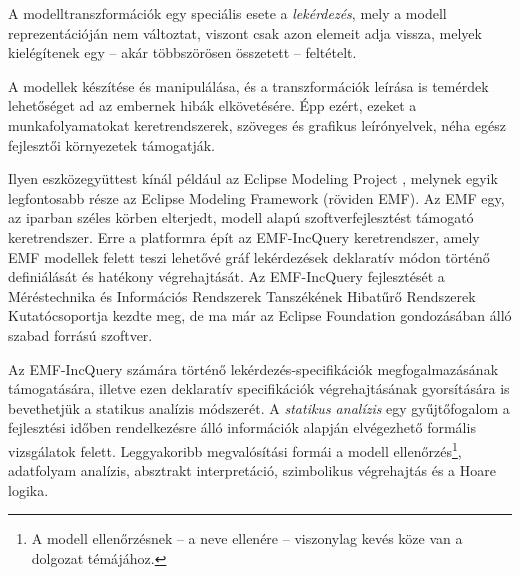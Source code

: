 A modelltranszformációk egy speciális esete a \emph{lekérdezés}, mely a modell reprezentációján nem változtat, viszont csak azon elemeit adja vissza, melyek kielégítenek egy -- akár többszörösen összetett -- feltételt.

A modellek készítése és manipulálása, és a transzformációk leírása is temérdek lehetőséget ad az embernek hibák elkövetésére.
Épp ezért, ezeket a munkafolyamatokat keretrendszerek, szöveges és grafikus \cite{Gyorok13} leírónyelvek, néha egész fejlesztői környezetek támogatják.

Ilyen eszközegyüttest kínál például az Eclipse Modeling Project \cite{EclipseOrgModeling}, melynek egyik legfontosabb része az Eclipse Modeling Framework (röviden \gls{EMF}).
Az \gls{EMF} egy, az iparban széles körben elterjedt, modell alapú szoftverfejlesztést támogató keretrendszer.
Erre a platformra épít az EMF-IncQuery keretrendszer, amely \gls{EMF} modellek felett teszi lehetővé gráf lekérdezések deklaratív módon történő definiálását és hatékony végrehajtását.
Az EMF-IncQuery fejlesztését a Méréstechnika és Információs Rendszerek Tanszékének Hibatűrő Rendszerek Kutatócsoportja kezdte meg, de ma már az Eclipse Foundation gondozásában álló szabad forrású szoftver.

Az EMF-IncQuery számára történő lekérdezés-specifikációk megfogalmazásának támogatására, illetve ezen deklaratív specifikációk végrehajtásának gyorsítására is bevethetjük a statikus analízis módszerét.
A \emph{statikus analízis} egy gyűjtőfogalom a fejlesztési időben rendelkezésre álló információk alapján elvégezhető formális vizsgálatok felett.
Leggyakoribb megvalósítási formái a modell ellenőrzés\footnote{A modell ellenőrzésnek -- a neve ellenére -- viszonylag kevés köze van a dolgozat témájához.}, adatfolyam analízis, absztrakt interpretáció, szimbolikus végrehajtás és a Hoare logika.


